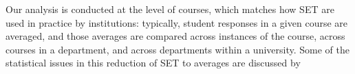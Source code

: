 \documentclass[12pt]{article}
\begin{document}
Our analysis is conducted at the level of courses, which matches how SET are
used in practice by institutions: typically, student responses in a given course
are averaged, and those averages are compared across instances of the course,
across courses in a department, and across departments within a university.
Some of the statistical issues in this reduction of SET to averages are 
discussed by \citet{starkFreishtat14}


%
%
%
\end{document}
